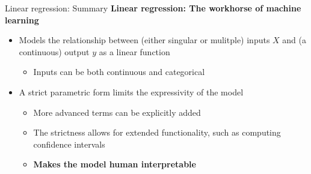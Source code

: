 \begin{frame}{Linear regression: Summary}
    \textbf{Linear regression: The workhorse of machine learning}
    \begin{itemize}
        \item Models the relationship between (either singular or mulitple) inputs $X$ and (a continuous) output $y$ as a linear function
        \begin{itemize}
            \item Inputs can be both continuous and categorical
        \end{itemize}
        \item A strict parametric form limits the expressivity of the model
        \begin{itemize}
            \item More advanced terms can be explicitly added
            \item The strictness allows for extended functionality, such as computing confidence intervals
            \item \textbf{Makes the model human interpretable}
        \end{itemize}
    \end{itemize}
\end{frame}


